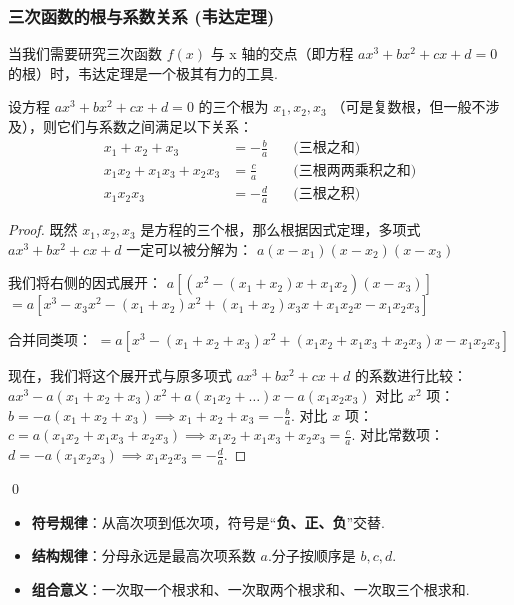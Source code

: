 \subsubsection*{三次函数的根与系数关系 (韦达定理)}
当我们需要研究三次函数 $f(x)$ 与 x 轴的交点（即方程 $ax^3+bx^2+cx+d=0$ 的根）时，韦达定理是一个极其有力的工具.

\begin{theorem}[三次函数韦达定理]
	设方程 $ax^3+bx^2+cx+d=0$ 的三个根为 $x_1, x_2, x_3$ （可是复数根，但一般不涉及），则它们与系数之间满足以下关系：
	\begin{align}
		x_1 + x_2 + x_3 &= -\frac{b}{a} \quad &\text{(三根之和)} \\
		x_1x_2 + x_1x_3 + x_2x_3 &= \frac{c}{a} \quad &\text{(三根两两乘积之和)} \\
		x_1x_2x_3 &= -\frac{d}{a} \quad &\text{(三根之积)}
	\end{align}
\end{theorem}
\begin{proof}
	既然 $x_1, x_2, x_3$ 是方程的三个根，那么根据因式定理，多项式 $ax^3+bx^2+cx+d$ 一定可以被分解为：
	$a(x-x_1)(x-x_2)(x-x_3)$
	
	我们将右侧的因式展开：
	$a[(x^2 - (x_1+x_2)x + x_1x_2)(x-x_3)]$
	$= a[x^3 - x_3x^2 - (x_1+x_2)x^2 + (x_1+x_2)x_3x + x_1x_2x - x_1x_2x_3]$
	
	合并同类项：
	$= a[x^3 - (x_1+x_2+x_3)x^2 + (x_1x_2+x_1x_3+x_2x_3)x - x_1x_2x_3]$
	
	现在，我们将这个展开式与原多项式 $ax^3+bx^2+cx+d$ 的系数进行比较：
	$ax^3 - a(x_1+x_2+x_3)x^2 + a(x_1x_2+\dots)x - a(x_1x_2x_3)$
	对比 $x^2$ 项：$b = -a(x_1+x_2+x_3) \implies x_1+x_2+x_3 = -\frac{b}{a}$.
	对比 $x$ 项：$c = a(x_1x_2+x_1x_3+x_2x_3) \implies x_1x_2+x_1x_3+x_2x_3 = \frac{c}{a}$.
	对比常数项：$d = -a(x_1x_2x_3) \implies x_1x_2x_3 = -\frac{d}{a}$.
\end{proof}
\qed

\begin{note}[如何记忆？]
	\begin{itemize}
		\item \textbf{符号规律}：从高次项到低次项，符号是“\textbf{负、正、负}”交替.
		\item \textbf{结构规律}：分母永远是最高次项系数 $a$.分子按顺序是 $b, c, d$.
		\item \textbf{组合意义}：一次取一个根求和、一次取两个根求和、一次取三个根求和.
	\end{itemize}
\end{note}


